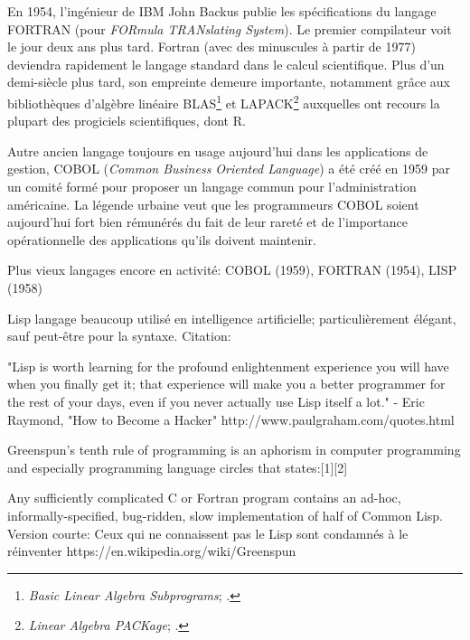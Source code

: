 En 1954, l'ingénieur de IBM John Backus publie les spécifications du
langage FORTRAN (pour \emph{FORmula TRANslating System}). Le premier
compilateur voit le jour deux ans plus tard. Fortran (avec des
minuscules à partir de 1977) deviendra rapidement le langage standard
dans le calcul scientifique. Plus d'un demi-siècle plus tard, son
empreinte demeure importante, notamment grâce aux bibliothèques
d'algèbre linéaire BLAS\footnote{%
  \emph{Basic Linear Algebra Subprograms};
  .} %
et LAPACK\footnote{%
  \emph{Linear Algebra PACKage};
  .} %
auxquelles ont recours la plupart des progiciels scientifiques, dont
R.

\begin{figure}[t]
\end{figure}

Autre ancien langage toujours en usage aujourd'hui dans les
applications de gestion, COBOL (\emph{Common Business Oriented
  Language}) a été créé en 1959 par un comité formé pour proposer un
langage commun pour l'administration américaine. La légende urbaine
veut que les programmeurs COBOL soient aujourd'hui fort bien rémunérés
du fait de leur rareté et de l'importance opérationnelle des
applications qu'ils doivent maintenir.

Plus vieux langages encore en activité: COBOL (1959), FORTRAN (1954),
LISP (1958)

Lisp langage beaucoup utilisé en intelligence artificielle;
particulièrement élégant, sauf peut-être pour la syntaxe. Citation:
\emph{}

"Lisp is worth learning for the profound enlightenment experience you will have when you finally get it; that experience will make you a better programmer for the rest of your days, even if you never actually use Lisp itself a lot."
- Eric Raymond, "How to Become a Hacker"
http://www.paulgraham.com/quotes.html

Greenspun's tenth rule of programming is an aphorism in computer programming and especially programming language circles that states:[1][2]

Any sufficiently complicated C or Fortran program contains an ad-hoc,
informally-specified, bug-ridden, slow implementation of half of
Common Lisp.
Version courte: Ceux qui ne connaissent pas le Lisp sont condamnés à
le réinventer
https://en.wikipedia.org/wiki/Greenspun%

